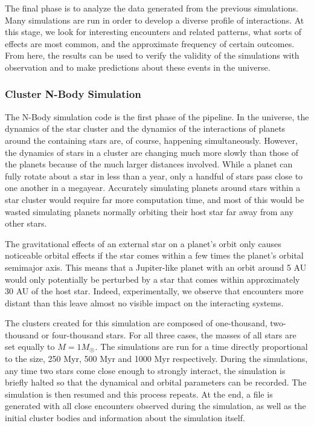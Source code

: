 \documentclass[12pt]{article}
\begin{document}
    The final phase is to analyze the data generated from the previous simulations.
    Many simulations are run in order to develop a diverse profile of interactions.
    At this stage, we look for interesting encounters and related patterns, 
    what sorts of effects are most common,
    and the approximate frequency of certain outcomes. From here, the results can
    be used to verify the validity of the simulations with observation and to make
    predictions about these events in the universe.


    \subsubsection{Cluster N-Body Simulation}

    The N-Body simulation code is the first phase of the pipeline. In the
    universe, the dynamics of the star cluster and the dynamics of the
    interactions of planets around the containing stars are, of course, happening
    simultaneously. However, the dynamics of stars in a cluster are changing much
    more slowly than those of the planets because of the much larger distances
    involved. While a planet can fully rotate about a star in less than a year,
    only a handful of stars pass close to one another in a megayear. Accurately
    simulating planets around stars within a star cluster would require
    far more computation time, and most of this would be wasted simulating
    planets normally orbiting their host star far away from any other stars.

    The gravitational effects of an external star on a planet's orbit only
    causes noticeable orbital effects if the star comes within a few times the
    planet's orbital semimajor axis. This means that a Jupiter-like planet with an orbit around
    5 AU would only potentially be perturbed by a star that comes within 
    approximately 30 AU of the host star. Indeed, experimentally, we observe that
    encounters more distant than this leave almost no visible impact on the
    interacting systems. 

    The clusters created for this simulation are composed of one-thousand, two-thousand
    or four-thousand stars. For all three cases, the masses of all stars are set equally
    to $M = 1 M_{\astrosun}$. The simulations are run for a time directly proportional
    to the size, 250 Myr, 500 Myr and 1000 Myr respectively.  During the simulations, 
    any time two stars
    come close enough to strongly interact, the simulation is briefly halted so that
    the dynamical and orbital parameters can be recorded. The simulation is then
    resumed and this process repeats. At the end, a file is generated with
    all close encounters observed during the simulation, as well as the initial
    cluster bodies and information about the simulation itself.
\end{document}

